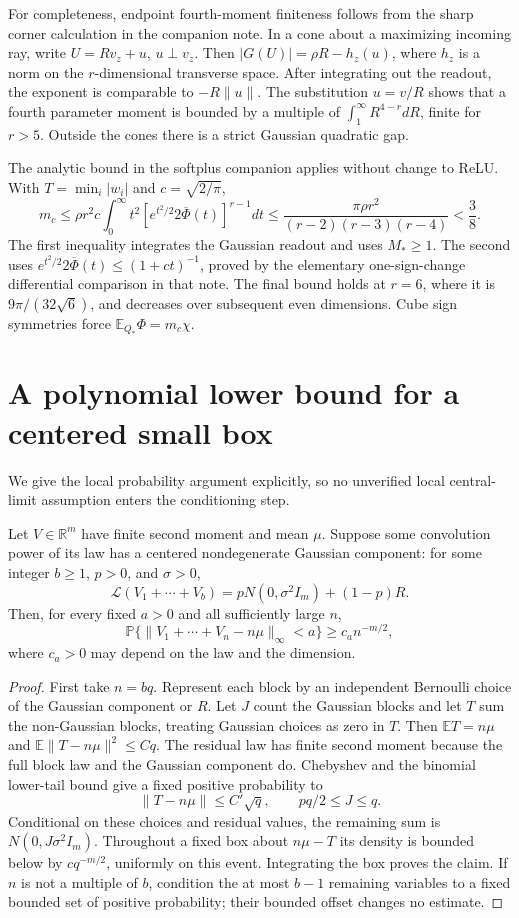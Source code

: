 \documentclass[11pt]{article}
\newcommand{\E}{\mathbb E}\newcommand{\Pp}{\mathbb P}
\newcommand{\R}{\mathbb R}\newcommand{\relu}{\operatorname{ReLU}}
\begin{document}
For completeness, endpoint fourth-moment finiteness follows from the
sharp corner calculation in the companion note. In a cone about a
maximizing incoming ray, write $U=Rv_z+u$, $u\perp v_z$. Then
$|G(U)|=\rho R-h_z(u)$, where $h_z$ is a norm on the $r$-dimensional
transverse space. After integrating out the readout, the exponent is
comparable to $-R\|u\|$. The substitution $u=v/R$ shows that a
fourth parameter moment is bounded by a multiple of
$\int_1^\infty R^{4-r}dR$, finite for $r>5$.
Outside the cones there is a strict Gaussian quadratic gap.

The analytic bound in the softplus companion applies without change
to ReLU. With $T=\min_i|w_i|$ and $c=\sqrt{2/\pi}$,
\[
 m_c\le\rho r^2c\int_0^\infty t^2
       [e^{t^2/2}2\overline\Phi(t)]^{r-1}dt
 \le\frac{\pi\rho r^2}{(r-2)(r-3)(r-4)}<\frac38.           \tag{4}
\]
The first inequality integrates the Gaussian readout and uses
$M_*\ge1$. The second uses
$e^{t^2/2}2\overline\Phi(t)\le(1+ct)^{-1}$, proved by the elementary
one-sign-change differential comparison in that note. The final bound
holds at $r=6$, where it is $9\pi/(32\sqrt6)$, and decreases over
subsequent even dimensions. Cube sign symmetries force
$\E_{Q_*}\Phi=m_c\chi$.

\section{A polynomial lower bound for a centered small box}
We give the local probability argument explicitly, so no unverified
local central-limit assumption enters the conditioning step.

\begin{lemma}\label{lem:local}
Let $V\in\R^m$ have finite second moment and mean $\mu$.
Suppose some convolution power of its law has a centered nondegenerate
Gaussian component: for some integer $b\ge1$, $p>0$, and $\sigma>0$,
\[
 \mathcal L(V_1+\cdots+V_b)
       =pN(0,\sigma^2I_m)+(1-p)R.
\]
Then, for every fixed $a>0$ and all sufficiently large $n$,
\[
 \Pp\{\|V_1+\cdots+V_n-n\mu\|_\infty<a\}
              \ge c_a n^{-m/2},
\]
where $c_a>0$ may depend on the law and the dimension.
\end{lemma}
\begin{proof}
First take $n=bq$. Represent each block by an independent Bernoulli
choice of the Gaussian component or $R$. Let $J$ count the Gaussian
blocks and let $T$ sum the non-Gaussian blocks, treating Gaussian
choices as zero in $T$. Then $\E T=n\mu$ and
$\E\|T-n\mu\|^2\le Cq$. The residual law has finite second moment
because the full block law and the Gaussian component do.
Chebyshev and the binomial lower-tail bound give a fixed positive
probability to
\[
 \|T-n\mu\|\le C'\sqrt q,\qquad pq/2\le J\le q.
\]
Conditional on these choices and residual values, the remaining sum
is $N(0,J\sigma^2I_m)$. Throughout a fixed box about $n\mu-T$ its
density is bounded below by $cq^{-m/2}$, uniformly on this event.
Integrating the box proves the claim. If $n$ is not a multiple of
$b$, condition the at most $b-1$ remaining variables to a fixed bounded
set of positive probability; their bounded offset changes no estimate.
\end{proof}
\end{document}

